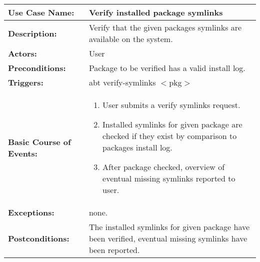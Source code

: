 
\begin{tabularx}{\linewidth}{|l|X|}
\hline
\textbf{Use Case Name:} & \textbf{Verify installed package symlinks} \\
\hline
\textbf{Description:} & 
Verify that the given packages symlinks are available on the system. 
\\
\hline
\textbf{Actors:} & User \\
\hline
\textbf{Preconditions:} & Package to be verified has a valid install log. \\
\hline
\textbf{Triggers:} & abt verify-symlinks $<$pkg$>$ \\
\hline
\textbf{Basic Course of Events:} & 
\begin{minipage}{\linewidth} 
  \vspace{0.05em}
  \begin{enumerate}
    \item User submits a verify symlinks request.
    \item Installed symlinks for given package are checked if they exist by comparison to packages install log.
    \item After package checked, overview of eventual missing symlinks reported to user.
  \end{enumerate}
  \vspace{0.05em}
\end{minipage}
\\
\hline 
\textbf{Exceptions:} & none. \\
\hline 
\textbf{Postconditions:} &
The installed symlinks for given package have been verified, eventual missing symlinks have been reported. \\
\hline
\end{tabularx}


